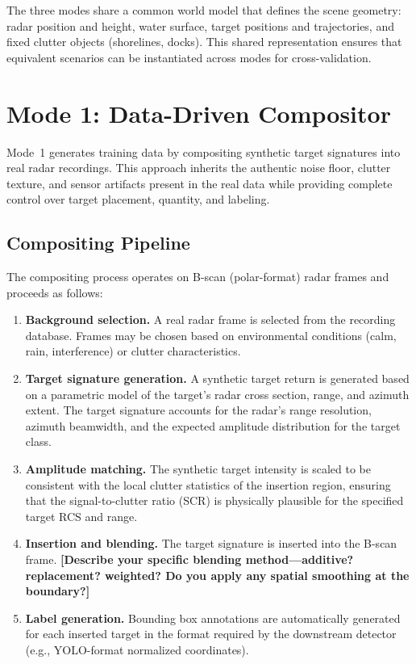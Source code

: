 \documentclass[twocolumn, 10pt]{article}
\newcommand{\ph}[1]{\textbf{[#1]}}
\begin{document}
The three modes share a common world model that defines the scene geometry: radar position and height, water surface, target positions and trajectories, and fixed clutter objects (shorelines, docks). This shared representation ensures that equivalent scenarios can be instantiated across modes for cross-validation.

\section{Mode 1: Data-Driven Compositor}
\label{sec:mode1}

Mode~1 generates training data by compositing synthetic target signatures into real radar recordings. This approach inherits the authentic noise floor, clutter texture, and sensor artifacts present in the real data while providing complete control over target placement, quantity, and labeling.

\subsection{Compositing Pipeline}

The compositing process operates on B-scan (polar-format) radar frames and proceeds as follows:

\begin{enumerate}
    \item \textbf{Background selection.} A real radar frame is selected from the recording database. Frames may be chosen based on environmental conditions (calm, rain, interference) or clutter characteristics.
    \item \textbf{Target signature generation.} A synthetic target return is generated based on a parametric model of the target's radar cross section, range, and azimuth extent. The target signature accounts for the radar's range resolution, azimuth beamwidth, and the expected amplitude distribution for the target class.
    \item \textbf{Amplitude matching.} The synthetic target intensity is scaled to be consistent with the local clutter statistics of the insertion region, ensuring that the signal-to-clutter ratio (SCR) is physically plausible for the specified target RCS and range.
    \item \textbf{Insertion and blending.} The target signature is inserted into the B-scan frame. \ph{Describe your specific blending method---additive? replacement? weighted? Do you apply any spatial smoothing at the boundary?}
    \item \textbf{Label generation.} Bounding box annotations are automatically generated for each inserted target in the format required by the downstream detector (e.g., YOLO-format normalized coordinates).
\end{enumerate}
\end{document}
